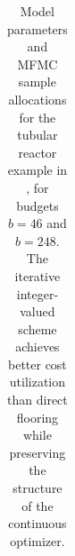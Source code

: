 \begin{table}[ht]
{\begin{tabular}{cc}
\end{tabular}
}
\caption{Model parameters and MFMC sample allocations for the tubular reactor example in \cite{PeWiGu:2016}, for budgets $b=46$ and $b=248$. The iterative integer-valued scheme achieves better cost utilization than direct flooring while preserving the structure of the continuous optimizer.}
\label{tab:MFMC_integer_comparison_Eg2}
\end{table}



